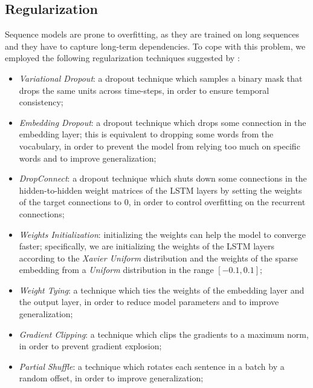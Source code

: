 \subsection{Regularization}
Sequence models are prone to overfitting, as they are trained on long sequences and they have to capture long-term dependencies. To cope with this problem, we employed the following regularization techniques suggested by \cite{merity2017regularizing}:
\begin{itemize}
    \item \emph{Variational Dropout}\cite{gal2016theoretically}: a dropout technique which samples a binary mask that drops the same units across time-steps, in order to ensure temporal consistency;
    \item \emph{Embedding Dropout}\cite{gal2016theoretically}: a dropout technique which drops some connection in the embedding layer; this is equivalent to dropping some words from the vocabulary, in order to prevent the model from relying too much on specific words and to improve generalization;
    \item \emph{DropConnect}\cite{wan2013dropconnect}: a dropout technique which shuts down some connections in the hidden-to-hidden weight matrices of the LSTM layers by setting the weights of the target connections to $0$, in order to control overfitting on the recurrent connections;
    \item \emph{Weights Initialization}: initializing the weights can help the model to converge faster; specifically, we are initializing the weights of the LSTM layers according to the  \emph{Xavier Uniform} distribution\cite{glorot2010understanding} and the weights of the sparse embedding from a  \emph{Uniform} distribution in the range \([-0.1, 0.1]\);
    \item \emph{Weight Tying}\cite{press2017tying}: a technique which ties the weights of the embedding layer and the output layer, in order to reduce model parameters and to improve generalization;
    \item \emph{Gradient Clipping}: a technique which clips the gradients to a maximum norm, in order to prevent gradient explosion;
    \item \emph{Partial Shuffle}\cite{press2019partially}: a technique which rotates each sentence in a batch by a random offset, in order to improve generalization;
\end{itemize}
